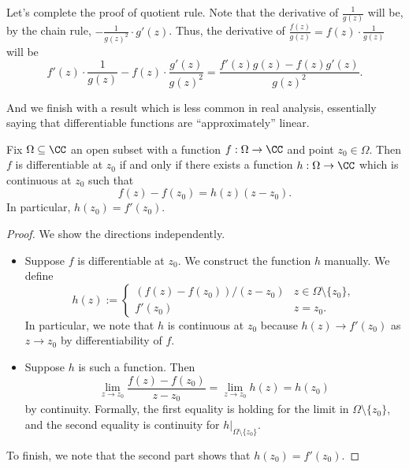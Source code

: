 \begin{remark}[Nir]
	Let's complete the proof of quotient rule. Note that the derivative of $\frac1{g(z)}$ will be, by the chain rule, $-\frac1{g(z)^2}\cdot g'(z)$. Thus, the derivative of $\frac{f(z)}{g(z)}=f(z)\cdot\frac1{g(z)}$ will be
	\[f'(z)\cdot\frac1{g(z)}-f(z)\cdot\frac{g'(z)}{g(z)^2}=\frac{f'(z)g(z)-f(z)g'(z)}{g(z)^2}.\]
\end{remark}
And we finish with a result which is less common in real analysis, essentially saying that differentiable functions are ``approximately'' linear.
\begin{proposition} \label{prop:cara}
	Fix $\Omega\subseteq\CC$ an open subset with a function $f:\Omega\to\CC$ and point $z_0\in\Omega$. Then $f$ is differentiable at $z_0$ if and only if there exists a function $h:\Omega\to\CC$ which is continuous at $z_0$ such that
	\[f(z)-f(z_0)=h(z)(z-z_0).\]
	In particular, $h(z_0)=f'(z_0)$.
\end{proposition}
\begin{proof}
	We show the directions independently.
	\begin{itemize}
		\item Suppose $f$ is differentiable at $z_0$. We construct the function $h$ manually. We define
		\[h(z):=\begin{cases}
			(f(z)-f(z_0))/(z-z_0) & z\in\Omega\setminus\{z_0\}, \\
			f'(z_0) & z=z_0.
		\end{cases}\]
		In particular, we note that $h$ is continuous at $z_0$ because $h(z)\to f'(z_0)$ as $z\to z_0$ by differentiability of $f$.
		\item Suppose $h$ is such a function. Then
		\[\lim_{z\to z_0}\frac{f(z)-f(z_0)}{z-z_0}=\lim_{z\to z_0}h(z)=h(z_0)\]
		by continuity. Formally, the first equality is holding for the limit in $\Omega\setminus\{z_0\}$, and the second equality is continuity for $h|_{\Omega\setminus\{z_0\}}$.
	\end{itemize}
	To finish, we note that the second part shows that $h(z_0)=f'(z_0)$.
\end{proof}
